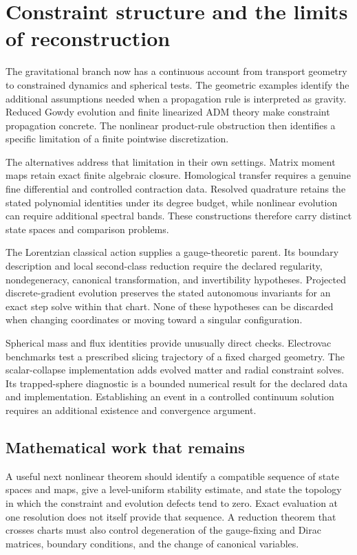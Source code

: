 \section{Constraint structure and the limits of reconstruction}
The gravitational branch now has a continuous account from transport geometry to constrained dynamics and spherical tests. The geometric examples identify the additional assumptions needed when a propagation rule is interpreted as gravity. Reduced Gowdy evolution and finite linearized ADM theory make constraint propagation concrete. The nonlinear product-rule obstruction then identifies a specific limitation of a finite pointwise discretization.

The alternatives address that limitation in their own settings. Matrix moment maps retain exact finite algebraic closure. Homological transfer requires a genuine fine differential and controlled contraction data. Resolved quadrature retains the stated polynomial identities under its degree budget, while nonlinear evolution can require additional spectral bands. These constructions therefore carry distinct state spaces and comparison problems.

The Lorentzian classical action supplies a gauge-theoretic parent. Its boundary description and local second-class reduction require the declared regularity, nondegeneracy, canonical transformation, and invertibility hypotheses. Projected discrete-gradient evolution preserves the stated autonomous invariants for an exact step solve within that chart. None of these hypotheses can be discarded when changing coordinates or moving toward a singular configuration.

Spherical mass and flux identities provide unusually direct checks. Electrovac benchmarks test a prescribed slicing trajectory of a fixed charged geometry. The scalar-collapse implementation adds evolved matter and radial constraint solves. Its trapped-sphere diagnostic is a bounded numerical result for the declared data and implementation. Establishing an event in a controlled continuum solution requires an additional existence and convergence argument.

\subsection{Mathematical work that remains}
A useful next nonlinear theorem should identify a compatible sequence of state spaces and maps, give a level-uniform stability estimate, and state the topology in which the constraint and evolution defects tend to zero. Exact evaluation at one resolution does not itself provide that sequence. A reduction theorem that crosses charts must also control degeneration of the gauge-fixing and Dirac matrices, boundary conditions, and the change of canonical variables.

